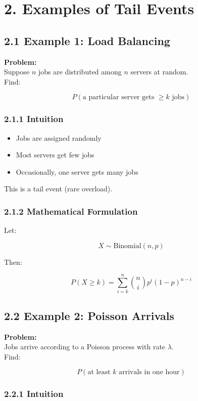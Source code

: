 \documentclass[12pt]{article}
\begin{document}
\section*{2. Examples of Tail Events}

\subsection*{2.1 Example 1: Load Balancing}

\textbf{Problem:} \\
Suppose $n$ jobs are distributed among $n$ servers at random. \\
Find:

\[
P(\text{a particular server gets } \geq k \text{ jobs})
\]

\subsubsection*{2.1.1 Intuition}

\begin{itemize}
\item Jobs are assigned randomly
\item Most servers get few jobs
\item Occasionally, one server gets many jobs
\end{itemize}

This is a tail event (rare overload).

\subsubsection*{2.1.2 Mathematical Formulation}

Let:

\[
X \sim \text{Binomial}(n, p)
\]

Then:

\[
P(X \geq k) = \sum_{i = k}^{n} \binom{n}{i} p^i (1 - p)^{n - i}
\]

\subsection*{2.2 Example 2: Poisson Arrivals}

\textbf{Problem:} \\
Jobs arrive according to a Poisson process with rate $\lambda$. \\
Find:

\[
P(\text{at least } k \text{ arrivals in one hour})
\]

\subsubsection*{2.2.1 Intuition}
\end{document}
